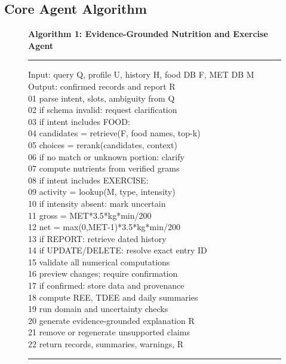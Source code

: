 \documentclass[journal,10pt]{IEEEtran}
\begin{document}
\subsection{Core Agent Algorithm}
\begin{figure}[!t]
\centering
\begin{minipage}{\columnwidth}
\small\textbf{Algorithm 1: Evidence-Grounded Nutrition and Exercise Agent}
\vspace{3pt}\hrule\vspace{3pt}
\begingroup\ttfamily\fontsize{7.5}{9.3}\selectfont
\noindent Input: query Q, profile U, history H, food DB F, MET DB M\\
Output: confirmed records and report R\\
01 parse intent, slots, ambiguity from Q\\
02 if schema invalid: request clarification\\
03 if intent includes FOOD:\\
04 \quad candidates = retrieve(F, food names, top-k)\\
05 \quad choices = rerank(candidates, context)\\
06 \quad if no match or unknown portion: clarify\\
07 \quad compute nutrients from verified grams\\
08 if intent includes EXERCISE:\\
09 \quad activity = lookup(M, type, intensity)\\
10 \quad if intensity absent: mark uncertain\\
11 \quad gross = MET*3.5*kg*min/200\\
12 \quad net = max(0,MET-1)*3.5*kg*min/200\\
13 if REPORT: retrieve dated history\\
14 if UPDATE/DELETE: resolve exact entry ID\\
15 validate all numerical computations\\
16 preview changes; require confirmation\\
17 if confirmed: store data and provenance\\
18 compute REE, TDEE and daily summaries\\
19 run domain and uncertainty checks\\
20 generate evidence-grounded explanation R\\
21 remove or regenerate unsupported claims\\
22 return records, summaries, warnings, R
\endgroup
\vspace{3pt}\hrule
\end{minipage}
\end{figure}
\end{document}
